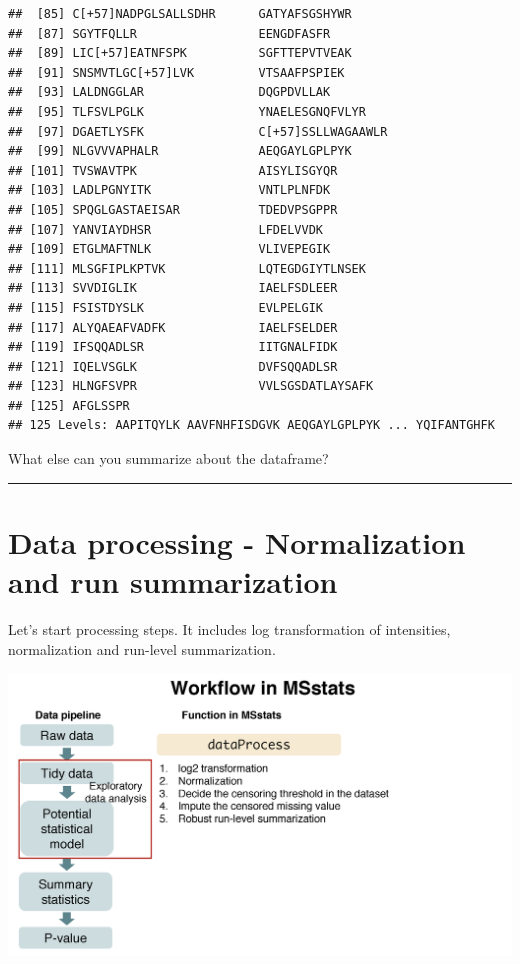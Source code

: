 \documentclass[]{book}
\begin{document}
\begin{verbatim}
##  [85] C[+57]NADPGLSALLSDHR      GATYAFSGSHYWR            
##  [87] SGYTFQLLR                 EENGDFASFR               
##  [89] LIC[+57]EATNFSPK          SGFTTEPVTVEAK            
##  [91] SNSMVTLGC[+57]LVK         VTSAAFPSPIEK             
##  [93] LALDNGGLAR                DQGPDVLLAK               
##  [95] TLFSVLPGLK                YNAELESGNQFVLYR          
##  [97] DGAETLYSFK                C[+57]SSLLWAGAAWLR       
##  [99] NLGVVVAPHALR              AEQGAYLGPLPYK            
## [101] TVSWAVTPK                 AISYLISGYQR              
## [103] LADLPGNYITK               VNTLPLNFDK               
## [105] SPQGLGASTAEISAR           TDEDVPSGPPR              
## [107] YANVIAYDHSR               LFDELVVDK                
## [109] ETGLMAFTNLK               VLIVEPEGIK               
## [111] MLSGFIPLKPTVK             LQTEGDGIYTLNSEK          
## [113] SVVDIGLIK                 IAELFSDLEER              
## [115] FSISTDYSLK                EVLPELGIK                
## [117] ALYQAEAFVADFK             IAELFSELDER              
## [119] IFSQQADLSR                IITGNALFIDK              
## [121] IQELVSGLK                 DVFSQQADLSR              
## [123] HLNGFSVPR                 VVLSGSDATLAYSAFK         
## [125] AFGLSSPR                 
## 125 Levels: AAPITQYLK AAVFNHFISDGVK AEQGAYLGPLPYK ... YQIFANTGHFK
\end{verbatim}

What else can you summarize about the dataframe?

\begin{center}\rule{0.5\linewidth}{\linethickness}\end{center}

\hypertarget{data-processing---normalization-and-run-summarization}{%
\section{Data processing - Normalization and run summarization}\label{data-processing---normalization-and-run-summarization}}

Let's start processing steps. It includes log transformation of intensities, normalization and run-level summarization.

\includegraphics{img/MSstats_dataprocess.png}
\end{document}
